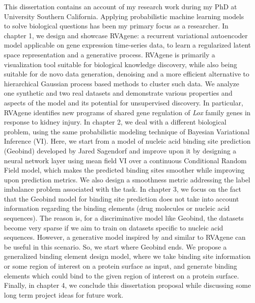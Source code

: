 This dissertation contains an account of my research work during my PhD at University Southern California.
Applying probabilistic machine learning models to solve biological questions has been my primary focus as a researcher. 
In chapter 1, we design and showcase RVAgene: a recurrent variational
autoencoder model applicable on gene expression time-series data, to learn a regularized latent
space representation and a generative process. RVAgene is primarily a visualization tool suitable for biological 
knowledge discovery, while also being suitable for de novo data generation, denoising and a more
efficient alternative to hierarchical Gaussian process based methods to cluster such data. We
analyze one synthetic and two real datasets and demonstrate various properties and aspects of the
model and its potential for unsupervised discovery.  In particular, RVAgene identifies new programs of 
shared gene regulation of \textit{Lox} family genes in response to kidney injury. In
chapter 2, we deal with a different biological problem, using the same probabilistic modeling
technique of Bayesian Variational Inference (VI). Here, we start from a model of nucleic acid binding site
prediction (Geobind) developed by Jared Sagendorf and improve upon it by designing a neural network layer using mean field
VI over a continuous Conditional Random Field model, which makes the predicted binding sites
smoother while improving upon prediction metrics. We also design a smoothness metric
addressing the label imbalance problem associated with the task. In chapter 3, we focus on the fact that the Geobind
model for binding site prediction does not take into account information regarding the binding
elements (drug molecules or nucleic acid sequences). The reason is, for a discriminative model like
Geobind, the datasets become very sparse if we aim to train on datasets specific to nucleic acid
sequences. However, a generative model inspired by and similar to RVAgene can be useful in this
scenario. So, we start where Geobind ends. We propose a generalized binding element design model, where we take binding site
information or some region of interest on a protein surface as input, and generate binding elements which
could bind to the given region of interest on a protein surface. Finally, in chapter 4, we conclude
this dissertation proposal while discussing some long term project ideas for future work.
